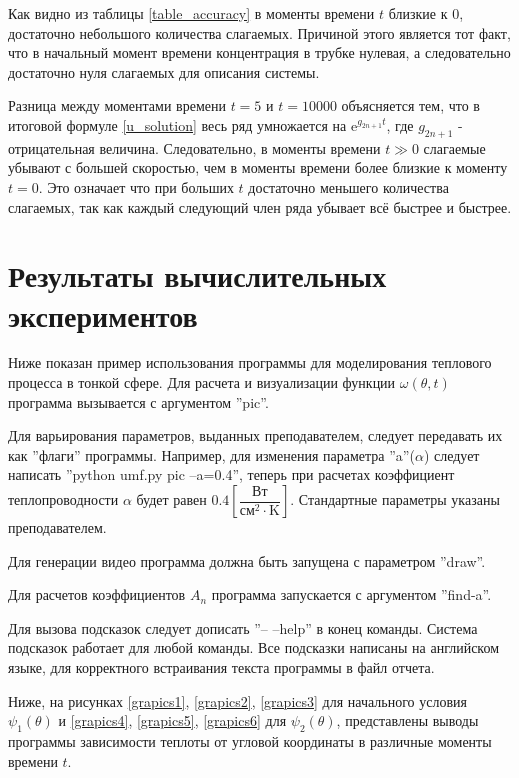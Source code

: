 {{Как видно из таблицы \ref{table_accuracy} в моменты времени $t$ близкие к 0, достаточно небольшого количества слагаемых. Причиной этого является тот факт, что в начальный момент времени концентрация в трубке нулевая, а следовательно достаточно нуля слагаемых для описания системы.

Разница между моментами времени $t = 5$ и $t = 10000$ объясняется тем, что в итоговой формуле \eqref{u_solution} весь ряд умножается на $\mathrm{e}^{g_{2n + 1} t}$, где $g_{2n + 1}$ - отрицательная величина. Следовательно, в моменты времени $t \gg 0$ слагаемые убывают с большей скоростью, чем в моменты времени более близкие к моменту $t = 0$. Это означает что при больших $t$ достаточно меньшего количества слагаемых, так как каждый следующий член ряда убывает всё быстрее и быстрее.
}
\newpage

\newpage
\section{Результаты вычислительных экспериментов}
{

Ниже показан пример использования программы для моделирования теплового процесса в тонкой сфере.
Для расчета и визуализации функции $\omega(\theta,t)$ программа вызывается с аргументом ''pic''.

Для варьирования параметров, выданных преподавателем, следует передавать их как ''флаги'' программы.
Например, для изменения параметра ''a''($\alpha$) следует написать ''python umf.py pic --a=0.4'', теперь при расчетах
коэффициент теплопроводности $\alpha$ будет равен $0.4\left[\dfrac{\text{Вт}}{\text{см}^2 \cdot \text{K}}\right]$.
Стандартные параметры указаны преподавателем.

Для генерации видео программа должна быть запущена с параметром ''draw''.

Для расчетов коэффициентов $A_n$ программа запускается с аргументом ''find-a''.

Для вызова подсказок следует дописать ''-- --help'' в конец команды. Система подсказок работает для любой команды.
Все подсказки написаны на английском языке, для корректного встраивания текста программы в файл отчета.

Ниже, на рисунках \ref{grapics1}, \ref{grapics2}, \ref{grapics3} для начального условия $\psi_1(\theta)$ и \ref{grapics4}, \ref{grapics5}, \ref{grapics6} для $\psi_2(\theta)$, представлены выводы программы зависимости теплоты от угловой координаты в различные моменты времени $t$.


}}
